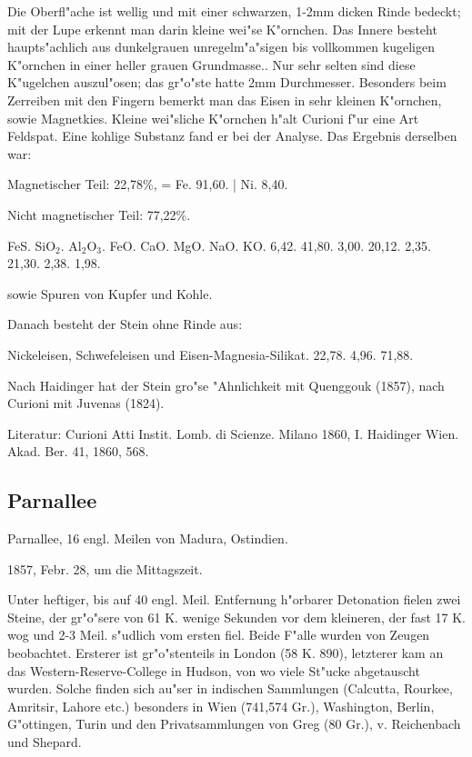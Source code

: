 \documentclass[a4paper, 11pt, oneside]{article}
\begin{document}
Die Oberfl"ache ist wellig und mit einer schwarzen, 1-2mm dicken Rinde bedeckt; mit der Lupe erkennt man darin kleine wei"se K"ornchen. Das Innere besteht haupts"achlich aus dunkelgrauen unregelm"a"sigen bis vollkommen kugeligen K"ornchen in einer heller grauen Grundmasse.. Nur sehr selten sind diese K"ugelchen auszul"osen; das gr"o"ste hatte 2mm Durchmesser. Besonders beim Zerreiben mit den Fingern bemerkt man das Eisen in sehr kleinen K"ornchen, sowie Magnetkies. Kleine wei"sliche K"ornchen h"alt Curioni f"ur eine Art Feldspat. Eine kohlige Substanz fand er bei der Analyse. Das Ergebnis derselben war:

Magnetischer Teil: 22,78\%, = Fe. 91,60. | Ni. 8,40.

Nicht magnetischer Teil: 77,22\%.

FeS. SiO$_{2}$. Al$_{2}$O$_{3}$. FeO. CaO. MgO. NaO. KO.  
6,42. 41,80. 3,00. 20,12. 2,35. 21,30. 2,38. 1,98.

sowie Spuren von Kupfer und Kohle.

Danach besteht der Stein ohne Rinde aus:

Nickeleisen, Schwefeleisen und Eisen-Magnesia-Silikat.  
22,78. 4,96. 71,88.

Nach Haidinger hat der Stein gro"se "Ahnlichkeit mit Quenggouk (1857), nach Curioni mit Juvenas (1824).

Literatur: Curioni Atti Instit. Lomb. di Scienze. Milano 1860, I. Haidinger Wien. Akad. Ber. 41, 1860, 568.

\subsection{Parnallee}

Parnallee, 16 engl. Meilen von Madura, Ostindien.

1857, Febr. 28, um die Mittagszeit.

Unter heftiger, bis auf 40 engl. Meil. Entfernung h"orbarer Detonation fielen zwei Steine, der gr"o"sere von 61 K. wenige Sekunden vor dem kleineren, der fast 17 K. wog und 2-3 Meil. s"udlich vom ersten fiel. Beide F"alle wurden von Zeugen beobachtet. Ersterer ist gr"o"stenteils in London (58 K. 890), letzterer kam an das Western-Reserve-College in Hudson, von wo viele St"ucke abgetauscht wurden. Solche finden sich au"ser in indischen Sammlungen (Calcutta, Rourkee, Amritsir, Lahore etc.) besonders in Wien (741,574 Gr.), Washington, Berlin, G"ottingen, Turin und den Privatsammlungen von Greg (80 Gr.), v. Reichenbach und Shepard.
\end{document}
